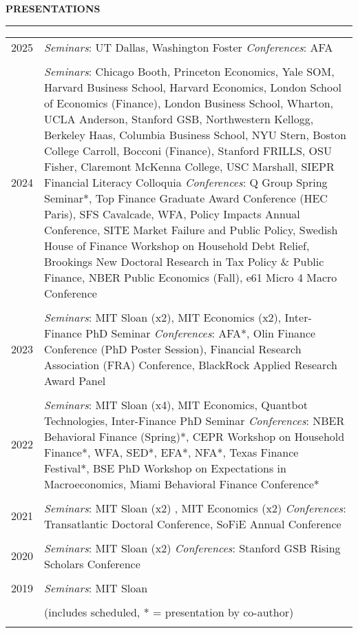\documentclass[a4paper, 10pt]{article}
\newcommand{\cvsec}[1]
{
	\needspace{2\baselineskip}
	\noindent \textbf{#1}
	
	\vspace{2pt}
	
	\hrule
	
	\bigskip
}
\newcommand{\cvitem}[2]{#1 & #2 \\ & \\}
\newenvironment{cvchrono}[1]
{
	\cvsec{#1}
	\begin{tabu} to \linewidth {X[1,l]X[6,l]} 
}
{
	\end{tabu}
}
\begin{document}
\begin{cvchrono}{PRESENTATIONS}
	\cvitem{2025}{\textit{Seminars}: UT Dallas, Washington Foster \newline \textit{Conferences}: AFA}
	\cvitem{2024}{\textit{Seminars}: Chicago Booth, Princeton Economics, Yale SOM, Harvard Business School, Harvard Economics, London School of Economics (Finance), London Business School, Wharton, UCLA Anderson, Stanford GSB, Northwestern Kellogg, Berkeley Haas, Columbia Business School, NYU Stern, Boston College Carroll, Bocconi (Finance), Stanford FRILLS, OSU Fisher, Claremont McKenna College, USC Marshall, SIEPR Financial Literacy Colloquia \newline \textit{Conferences}: Q Group Spring Seminar*, Top Finance Graduate Award Conference (HEC Paris), SFS Cavalcade, WFA, Policy Impacts Annual Conference, SITE Market Failure and Public Policy, Swedish House of Finance Workshop on Household Debt Relief, Brookings New Doctoral Research in Tax Policy \& Public Finance, NBER Public Economics (Fall), e61 Micro 4 Macro Conference}
	\cvitem{2023}{\textit{Seminars}: MIT Sloan (x2), MIT Economics (x2), Inter-Finance PhD Seminar \newline \textit{Conferences}: AFA*, Olin Finance Conference (PhD Poster Session), Financial Research Association (FRA) Conference, BlackRock Applied Research Award Panel}
	\cvitem{2022}{\textit{Seminars}: MIT Sloan (x4), MIT Economics, Quantbot Technologies, Inter-Finance PhD Seminar \newline \textit{Conferences}: NBER Behavioral Finance (Spring)*, CEPR Workshop on Household Finance*, WFA, SED*, EFA*, NFA*, Texas Finance Festival*, BSE PhD Workshop on Expectations in Macroeconomics, Miami Behavioral Finance Conference*}
	\cvitem{2021}{\textit{Seminars}: MIT Sloan (x2) , MIT Economics (x2) \newline \textit{Conferences}: Transatlantic Doctoral Conference, SoFiE Annual Conference}
	\cvitem{2020}{\textit{Seminars}: MIT Sloan (x2) \newline \textit{Conferences}: Stanford GSB Rising Scholars Conference}
	\cvitem{2019}{\textit{Seminars}: MIT Sloan}
	\cvitem{}{(includes scheduled, * = presentation by co-author)}
\end{cvchrono}

\end{document}
